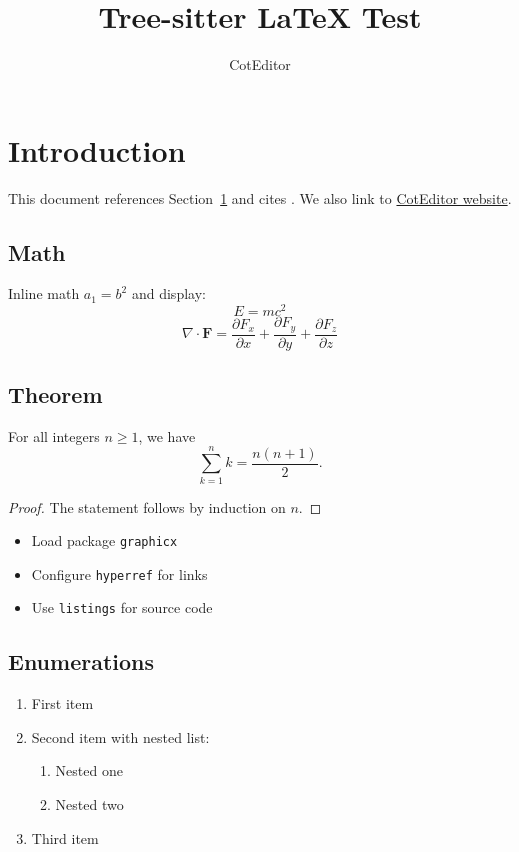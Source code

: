 \documentclass{article}
\title{Tree-sitter LaTeX Test}
\author{CotEditor}
\newcommand{\pkg}[1]{\texttt{#1}}
\newcommand{\vect}[1]{\mathbf{#1}}
\begin{document}
\maketitle
\tableofcontents

\section{Introduction}\label{sec:intro}
This document references Section~\ref{sec:intro} and cites \cite{knuth1984texbook}.
We also link to \href{https://coteditor.com}{CotEditor website}.

\subsection{Math}
Inline math $a_1 = b^2$ and display:
\[
  E = mc^2
\]
\[
  \nabla \cdot \vect{F} = \frac{\partial F_x}{\partial x}
  + \frac{\partial F_y}{\partial y}
  + \frac{\partial F_z}{\partial z}
\]

\subsection{Theorem}
\begin{theorem}
For all integers $n \ge 1$, we have
\[
  \sum_{k=1}^{n} k = \frac{n(n+1)}{2}.
\]
\end{theorem}

\begin{proof}
The statement follows by induction on $n$.
\end{proof}

\begin{itemize}
  \item Load package \pkg{graphicx}
  \item Configure \pkg{hyperref} for links
  \item Use \pkg{listings} for source code
\end{itemize}

\subsection{Enumerations}
\begin{enumerate}
  \item First item
  \item Second item with nested list:
  \begin{enumerate}
    \item Nested one
    \item Nested two
  \end{enumerate}
  \item Third item
\end{enumerate}
\end{document}
